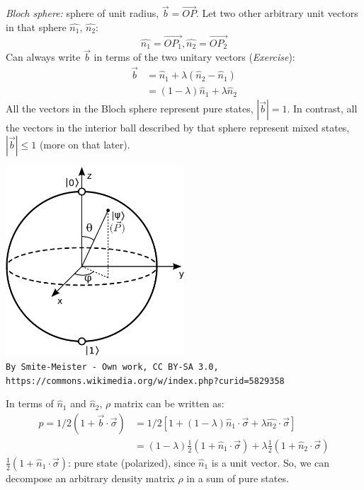 \documentclass[12pt]{article}
\newcommand{\be}{\begin{equation}}
\newcommand{\ee}{\end{equation}}
\begin{document}
\emph{Bloch sphere:} sphere of unit radius, $\vec{b} = \vec{OP}$.
Let two other arbitrary unit vectors in that sphere $\hat{n_1}$, $\hat{n_2}$:
\be
\hat{n_1} = \vec{OP_1}, \hat{n_2} = \vec{OP_2}
\ee
Can always write $\vec{b}$ in terms of the two unitary vectors (\emph{Exercise}):
\be
\begin{aligned} 
\vec{b}&= \hat{n}_1 + \lambda(\hat{n}_2 - \hat{n}_1)\\
&= (1-\lambda) \hat{n}_1 + \lambda\hat{n}_2
\end{aligned}
\ee
All the vectors in the Bloch sphere represent pure states, $|\vec{b}| = 1$.
In contrast, all the vectors in the interior ball described by that sphere represent mixed states,
$|\vec{b}| \leqslant 1$ (more on that later).
\begin{center}
\includegraphics[width=0.5\textwidth]{Figures/Bloch_sphere.pdf}\\
\scriptsize{\texttt{By Smite-Meister - Own work, CC BY-SA 3.0, https://commons.wikimedia.org/w/index.php?curid=5829358}}
\end{center}


In terms of $\hat{n}_1$ and $\hat{n}_2$, $\rho$ matrix can be written as:
\be
\begin{aligned} p=1 / 2(1+\vec{b} \cdot \vec{\sigma}) 
&=1 / 2\left[1+(1-\lambda) \hat{n}_{1} \cdot \vec{\sigma}+\lambda \hat{n_{2}} \cdot \vec{\sigma}\right] \\ 
&=(1-\lambda) \frac{1}{2}\left(1+\hat{n}_{1} \cdot \vec{\sigma}\right)+\lambda \frac{1}{2}\left(1+\hat{n}_{2}\cdot \vec{\sigma}\right) \end{aligned}
\ee
$\frac{1}{2}(1+\hat{n}_{1}\cdot\vec{\sigma})$: pure state (polarized), since $\hat{n}_{1}$ is a unit vector.
So, we can decompose an arbitrary density matrix $\rho$ in a sum of pure states.
\end{document}
